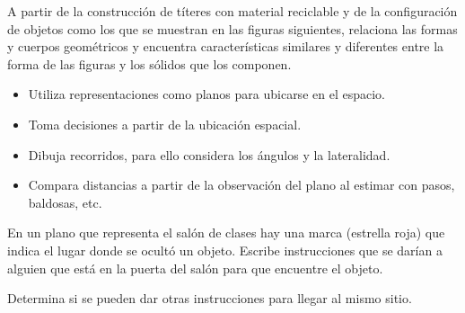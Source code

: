 \ejemplo

A partir de la construcción de títeres con material reciclable y de la configuración de objetos como los que se muestran en las figuras siguientes, relaciona las formas y cuerpos geométricos y encuentra características similares y diferentes entre la forma de las figuras y los sólidos que los componen.







\evidencias

\begin{itemize}
  \item Utiliza representaciones como planos para ubicarse en el espacio.
  \item Toma decisiones a partir de la ubicación espacial.
  \item Dibuja recorridos, para ello considera los ángulos y la lateralidad.
  \item Compara distancias a partir de la observación del plano al estimar con pasos, baldosas, etc.
\end{itemize}

\ejemplo

En un plano que representa el salón de clases hay una marca (estrella roja) que indica el lugar donde se ocultó un objeto. Escribe instrucciones que se darían a alguien que está en la puerta del salón para que encuentre el objeto.

Determina si se pueden dar otras instrucciones para llegar al mismo sitio.



